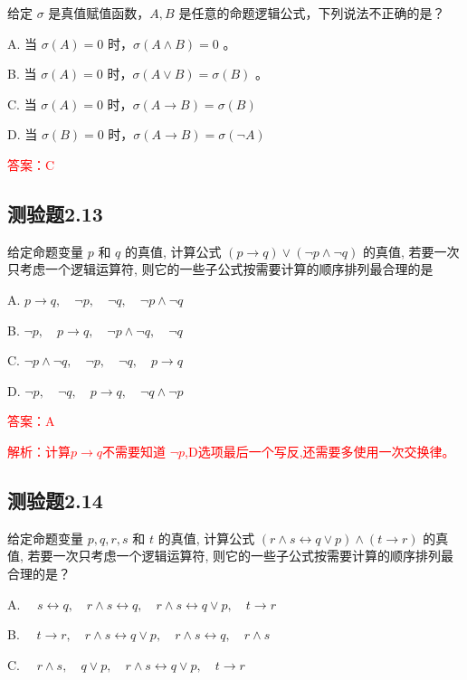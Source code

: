 \documentclass[UTF8, heading=true]{ctexart}
\begin{document}
给定 $\sigma$ 是真值赋值函数，$A, B$ 是任意的命题逻辑公式，下列说法不正确的是？

A. 当 $\sigma(A)=0$ 时，$\sigma(A \wedge B)=0$ 。

B. 当 $\sigma(A)=0$ 时，$\sigma(A \vee B)=\sigma(B)$ 。

C. 当 $\sigma(A)=0$ 时，$\sigma(A \rightarrow B)=\sigma(B)$

D. 当 $\sigma(B)=0$ 时，$\sigma(A \rightarrow B)=\sigma(\neg A)$

\textcolor{red}{答案：C}

\subsection{测验题2.13}

给定命题变量 $p$ 和 $q$ 的真值, 计算公式 $(p \rightarrow q) \vee(\neg p \wedge \neg q)$ 的真值, 若要一次只考虑一个逻辑运算符, 则它的一些子公式按需要计算的顺序排列最合理的是 $\qquad$

A. $
p \rightarrow q, \quad \neg p, \quad \neg q, \quad \neg p \wedge \neg q
$

B. $
\neg p, \quad p \rightarrow q, \quad \neg p \wedge \neg q, \quad \neg q
$

C. $
\neg p \wedge \neg q, \quad \neg p, \quad \neg q, \quad p \rightarrow q
$

D. $
\neg p, \quad \neg q, \quad p \rightarrow q, \quad \neg q \wedge \neg p
$

\textcolor{red}{答案：A}

\textcolor{red}{解析：计算$p \rightarrow q$不需要知道 $\neg p$,D选项最后一个写反,还需要多使用一次交换律。}


\subsection{测验题2.14}

给定命题变量 $p, q, r, s$ 和 $t$ 的真值, 计算公式 $(r \wedge s \leftrightarrow q \vee p) \wedge(t \rightarrow r)$ 的真值, 若要一次只考虑一个逻辑运算符, 则它的一些子公式按需要计算的顺序排列最合理的是？

A. $\quad s \leftrightarrow q, \quad r \wedge s \leftrightarrow q, \quad r \wedge s \leftrightarrow q \vee p, \quad t \rightarrow r$

B. $\quad t \rightarrow r, \quad r \wedge s \leftrightarrow q \vee p, \quad r \wedge s \leftrightarrow q, \quad r \wedge s$

C. $\quad r \wedge s, \quad q \vee p, \quad r \wedge s \leftrightarrow q \vee p, \quad t \rightarrow r$
\end{document}

